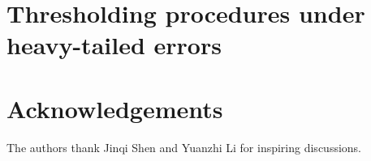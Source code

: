 \documentclass[aos,preprint]{imsart}
\numberwithin{equation}{section}
\theoremstyle{plain}
\theoremstyle{remark}
\begin{document}
\section{Thresholding procedures under heavy-tailed errors}
\label{sec:heavy-tailed}



\section*{Acknowledgements}
The authors thank Jinqi Shen and Yuanzhi Li for inspiring discussions.




\end{document}
